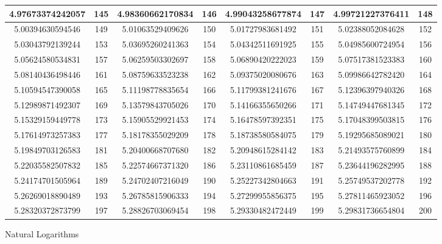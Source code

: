 \documentclass{exam}
\begin{document}
\begin{figure}
\begin{tabular}{|c|c||c|c||c|c||c|c|}
\hline
4.97673374242057 & 145 &4.98360662170834 & 146 &4.99043258677874 & 147 &4.99721227376411 & 148 \\
\hline
5.00394630594546 & 149 &5.01063529409626 & 150 &5.01727983681492 & 151 &5.02388052084628 & 152 \\
\hline
5.03043792139244 & 153 &5.03695260241363 & 154 &5.04342511691925 & 155 &5.04985600724954 & 156 \\
\hline
5.05624580534831 & 157 &5.06259503302697 & 158 &5.06890420222023 & 159 &5.07517381523383 & 160 \\
\hline
5.08140436498446 & 161 &5.08759633523238 & 162 &5.09375020080676 & 163 &5.09986642782420 & 164 \\
\hline
5.10594547390058 & 165 &5.11198778835654 & 166 &5.11799381241676 & 167 &5.12396397940326 & 168 \\
\hline
5.12989871492307 & 169 &5.13579843705026 & 170 &5.14166355650266 & 171 &5.14749447681345 & 172 \\
\hline
5.15329159449778 & 173 &5.15905529921453 & 174 &5.16478597392351 & 175 &5.17048399503815 & 176 \\
\hline
5.17614973257383 & 177 &5.18178355029209 & 178 &5.18738580584075 & 179 &5.19295685089021 & 180 \\
\hline
5.19849703126583 & 181 &5.20400668707680 & 182 &5.20948615284142 & 183 &5.21493575760899 & 184 \\
\hline
5.22035582507832 & 185 &5.22574667371320 & 186 &5.23110861685459 & 187 &5.23644196282995 & 188 \\
\hline
5.24174701505964 & 189 &5.24702407216049 & 190 &5.25227342804663 & 191 &5.25749537202778 & 192 \\
\hline
5.26269018890489 & 193 &5.26785815906333 & 194 &5.27299955856375 & 195 &5.27811465923052 & 196 \\
\hline
5.28320372873799 & 197 &5.28826703069454 & 198 &5.29330482472449 & 199 &5.29831736654804 & 200 \\
\hline


\hline
\end{tabular}

\caption{Natural Logarithms}
\end{figure}
\end{document}

